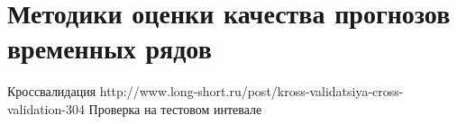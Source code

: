 \linespread{1.13}\selectfont

\chapter{Методики оценки качества прогнозов временных рядов}

Кроссвалидация http://www.long-short.ru/post/kross-validatsiya-cross-validation-304
Проверка на тестовом интевале